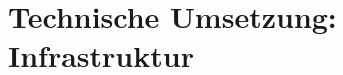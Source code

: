 \hypertarget{technische-umsetzung-infrastruktur}{%
\section{Technische Umsetzung:
Infrastruktur}\label{technische-umsetzung-infrastruktur}}
